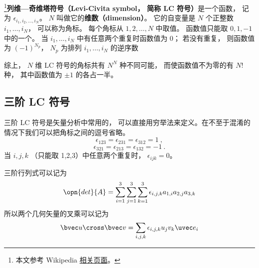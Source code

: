 

\footnote{本文参考 Wikipedia \href{https://en.wikipedia.org/wiki/Levi-Civita_symbol}{相关页面}。}\textbf{列维—奇维塔符号（Levi-Civita symbol， 简称 LC 符号）}是一个函数， 记为 $\epsilon_{i_1, i_2, \dots, i_N}$。 $N$ 叫做它的\textbf{维数（dimension）}。 它的自变量是 $N$ 个正整数 $i_1, \dots, i_N$， 可以称为角标。 每个角标从 $1, 2, \dots, N$ 中取值。 函数值只能取 $0, 1, -1$ 中的一个。 当 $i_1, \dots, i_N$ 中有任意两个重复时函数值为 0； 若没有重复， 则函数值为 $(-1)^{N_p}$， $N_p$ 为排列 $i_1, \dots, i_N$ 的逆序数

综上， $N$ 维 LC 符号的角标共有 $N^N$ 种不同可能， 而使函数值不为零的有 $N!$ 种， 其中函数值为 $\pm 1$ 的各占一半。

\subsection{三阶 LC 符号}
三阶 LC 符号是矢量分析中常用的， 可以直接用穷举法来定义。在不至于混淆的情况下我们可以把角标之间的逗号省略。
\begin{equation}
\epsilon_{123} = \epsilon_{231} = \epsilon_{312} = 1~,
\end{equation}
\begin{equation}
\epsilon_{321} = \epsilon_{213} = \epsilon_{132} = -1~.
\end{equation}
当 $i,j,k$ （只能取 1,2,3）中任意两个重复时， $\epsilon_{ijk} = 0$。

三阶行列式可以记为
\begin{equation}
\opn{det}{A} = \sum_{i = 1}^3 \sum_{j = 1}^3 \sum_{k = 1}^3 \epsilon_{i,j,k} a_{1,i} a_{2,j} a_{3,k}
\end{equation}
所以两个几何矢量的叉乘可以记为
\begin{equation}
\bvec u \cross \bvec v = \sum_{i,j,k} \epsilon_{i,j,k} u_j v_k \uvec e_i
\end{equation}
